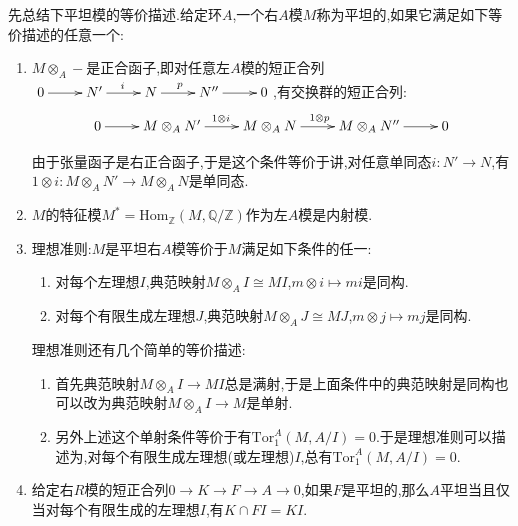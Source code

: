 先总结下平坦模的等价描述.给定环$A$,一个右$A$模$M$称为平坦的,如果它满足如下等价描述的任意一个:
\begin{enumerate}
	\item $M\otimes_A-$是正合函子,即对任意左$A$模的短正合列$\xymatrix{0\ar[r]&N'\ar[r]^i&N\ar[r]^{p}&N''\ar[r]&0}$,有交换群的短正合列:
	$$\xymatrix{0\ar[r]&M\otimes_AN'\ar[r]^{1\otimes i}&M\otimes_AN\ar[r]^{1\otimes p}&M\otimes_AN''\ar[r]&0}$$
	
	由于张量函子是右正合函子,于是这个条件等价于讲,对任意单同态$i:N'\to N$,有$1\otimes i:M\otimes_AN'\to M\otimes_AN$是单同态.
	\item $M$的特征模$M^*=\mathrm{Hom}_{\mathbb{Z}}(M,\mathbb{Q}/\mathbb{Z})$作为左$A$模是内射模.
	\item 理想准则:$M$是平坦右$A$模等价于$M$满足如下条件的任一:
	\begin{enumerate}
		\item 对每个左理想$I$,典范映射$M\otimes_AI\cong MI$,$m\otimes i\mapsto mi$是同构.
		\item 对每个有限生成左理想$J$,典范映射$M\otimes_AJ\cong MJ$,$m\otimes j\mapsto mj$是同构.
	\end{enumerate}
    
    理想准则还有几个简单的等价描述:
    \begin{enumerate}
    	\item 首先典范映射$M\otimes_AI\to MI$总是满射,于是上面条件中的典范映射是同构也可以改为典范映射$M\otimes_AI\to M$是单射.
    	\item 另外上述这个单射条件等价于有$\mathrm{Tor}_1^A(M,A/I)=0$.于是理想准则可以描述为,对每个有限生成左理想(或左理想)$I$,总有$\mathrm{Tor}_1^A(M,A/I)=0$.
    \end{enumerate}
	\item 给定右$R$模的短正合列$0\to K\to F\to A\to0$,如果$F$是平坦的,那么$A$平坦当且仅当对每个有限生成的左理想$I$,有$K\cap FI=KI$.
\end{enumerate}

